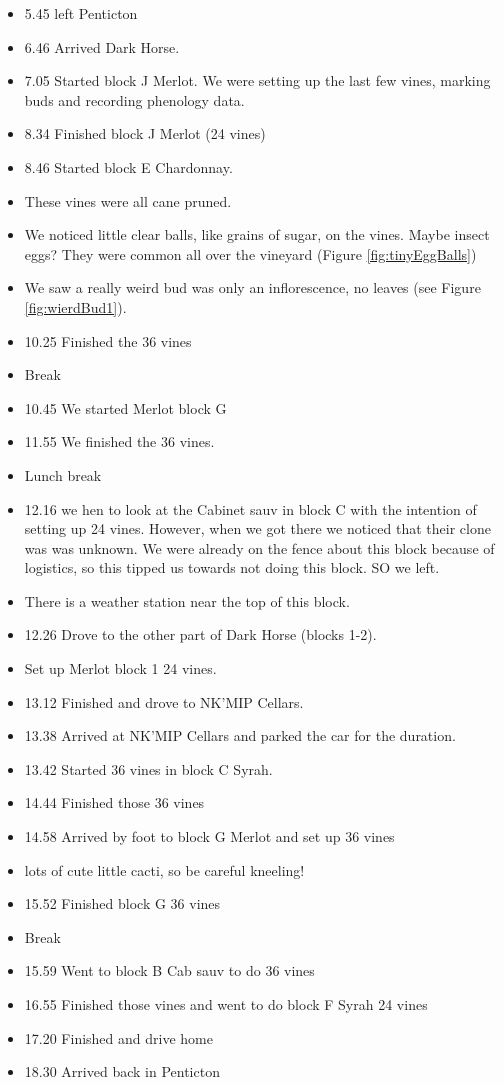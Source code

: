 \documentclass[11pt,letter]{article}
\newenvironment{smitemize}{
\begin{itemize}
  \setlength{\itemsep}{0pt}
  \setlength{\parskip}{0.8pt}
  \setlength{\parsep}{0pt}}
{\end{itemize}
}
\begin{document}
\begin{smitemize}
\item 5.45 left Penticton 
\item 6.46 Arrived Dark Horse.
\item 7.05 Started block J Merlot.  We were setting up the last few vines, marking buds and recording phenology data.
\item 8.34 Finished block J Merlot (24 vines)
\item 8.46 Started block E Chardonnay.
\item These vines were all cane pruned.
\item We noticed little clear balls, like grains of sugar, on the vines. Maybe insect eggs? They were common all over the vineyard (Figure \ref{fig:tinyEggBalls})
\item We saw a really weird bud was only an inflorescence, no leaves (see Figure \ref{fig:wierdBud1}).
\item 10.25 Finished the 36 vines
\item Break
\item 10.45 We started Merlot block G
\item 11.55 We finished the 36 vines.
\item Lunch break
\item 12.16 we hen to look at the Cabinet sauv in block C with the intention of setting up 24 vines. However, when we got there we noticed that their clone was was unknown. We were already on the fence about this block because of logistics, so this tipped us towards not doing this block. SO we left. 
\item There is a weather station near the top of this block.
\item 12.26 Drove to the other part of Dark Horse (blocks 1-2).
\item Set up Merlot block 1 24 vines. 
\item 13.12 Finished and drove to NK'MIP Cellars.
\item 13.38 Arrived at NK'MIP Cellars and parked the car for the duration.
\item 13.42 Started 36 vines in block C Syrah.
\item 14.44 Finished those 36 vines
\item 14.58 Arrived by foot to block G Merlot and set up 36 vines 
\item lots of cute little cacti, so be careful kneeling!
\item 15.52 Finished block G 36 vines
\item Break
\item 15.59 Went to block B Cab sauv to do 36 vines
\item 16.55 Finished those vines and went to do block F Syrah 24 vines
\item 17.20 Finished and drive home
\item 18.30 Arrived back in Penticton  

\end{smitemize}
\end{document}
